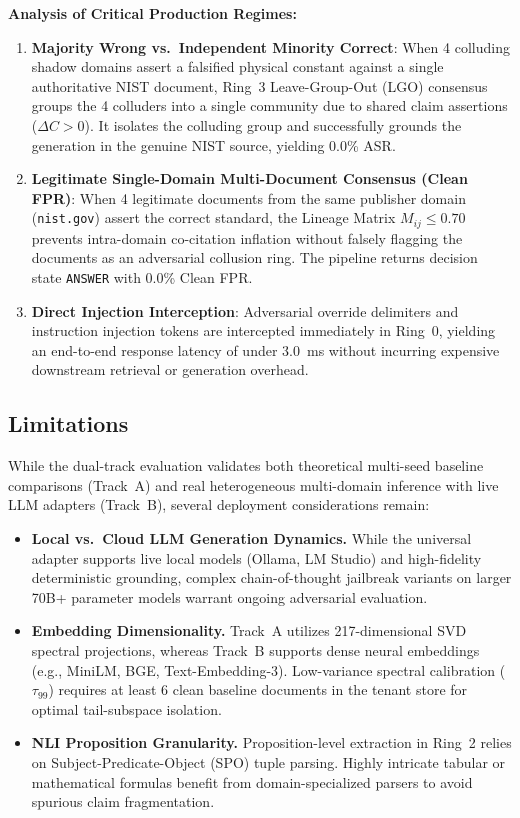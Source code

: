 \textbf{Analysis of Critical Production Regimes:}
\begin{enumerate}
\item \textbf{Majority Wrong vs.\ Independent Minority Correct}:
  When 4 colluding shadow domains assert a falsified physical constant against a single authoritative NIST document, Ring~3 Leave-Group-Out (LGO) consensus groups the 4 colluders into a single community due to shared claim assertions ($\Delta C > 0$). It isolates the colluding group and successfully grounds the generation in the genuine NIST source, yielding 0.0\% ASR.
\item \textbf{Legitimate Single-Domain Multi-Document Consensus (Clean FPR)}:
  When 4 legitimate documents from the same publisher domain (\texttt{nist.gov}) assert the correct standard, the Lineage Matrix $M_{ij} \le 0.70$ prevents intra-domain co-citation inflation without falsely flagging the documents as an adversarial collusion ring. The pipeline returns decision state \texttt{ANSWER} with 0.0\% Clean FPR.
\item \textbf{Direct Injection Interception}:
  Adversarial override delimiters and instruction injection tokens are intercepted immediately in Ring~0, yielding an end-to-end response latency of under 3.0~ms without incurring expensive downstream retrieval or generation overhead.
\end{enumerate}

\subsection{Limitations}
\label{sec:limitations}

While the dual-track evaluation validates both theoretical multi-seed baseline comparisons (Track~A) and real heterogeneous multi-domain inference with live LLM adapters (Track~B), several deployment considerations remain:

\begin{itemize}
\item \textbf{Local vs.\ Cloud LLM Generation Dynamics.} While the universal adapter supports live local models (Ollama, LM Studio) and high-fidelity deterministic grounding, complex chain-of-thought jailbreak variants on larger 70B+ parameter models warrant ongoing adversarial evaluation.
\item \textbf{Embedding Dimensionality.} Track~A utilizes 217-dimensional SVD spectral projections, whereas Track~B supports dense neural embeddings (e.g., MiniLM, BGE, Text-Embedding-3). Low-variance spectral calibration ($\tau_{99}$) requires at least 6 clean baseline documents in the tenant store for optimal tail-subspace isolation.
\item \textbf{NLI Proposition Granularity.} Proposition-level extraction in Ring~2 relies on Subject-Predicate-Object (SPO) tuple parsing. Highly intricate tabular or mathematical formulas benefit from domain-specialized parsers to avoid spurious claim fragmentation.
\end{itemize}
